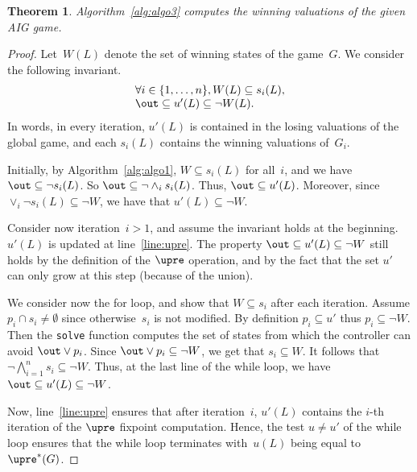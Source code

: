 \documentclass[submission,copyright,creativecommons]{eptcs}
\newtheorem{theorem}{Theorem}
\begin{document}
\begin{theorem}
  Algorithm~\ref{alg:algo3} computes the winning valuations of the given AIG game.
\end{theorem}
\begin{proof}
    Let~$W(L)$ denote the set of winning states of the game~$G$.
    We consider the following invariant.
    \begin{equation}
    \begin{array}{l}
     \forall i\in\{1,\ldots,n\}, W(L) \subseteq s_i(L),
     \\\out \subseteq u'(L) \subseteq \lnot W(L).
    \end{array}
    \label{eqn:invar3}
    \end{equation}
    In words, in every iteration, 
    $u'(L)$ is contained in the losing valuations of the global game, and
    each $s_i(L)$ contains the winning valuations of~$G_i$.

    Initially, by Algorithm~\ref{alg:algo1}, $W \subseteq s_i(L)$
    for all~$i$, and we have
    $\out \subseteq \lnot s_i(L)$. So $\out \subseteq \lnot \land_i s_i(L)$.
    Thus, $\out \subseteq u'(L)$. 
    Moreover, since $\lor_i \lnot s_i(L) \subseteq \lnot W$, we have
    that $u'(L) \subseteq \lnot W$.


    Consider now iteration~$i>1$, and assume the invariant holds at the
    beginning. $u'(L)$ is updated at line~\ref{line:upre}.
    The property $\out \subseteq u'(L) \subseteq \lnot W$ still holds by the
    definition of the $\upre$ operation, and by the fact that the set $u'$ 
    can only grow at this step (because of the union).

    We consider now the for loop, and show that $W \subseteq s_i$ after each
    iteration. Assume $p_i \cap s_i \neq \emptyset$ since otherwise~$s_i$ is not
    modified. By definition $p_i \subseteq u'$
    thus $p_i \subseteq \lnot W$. Then the \texttt{solve} function
    computes the set of states from which the controller can avoid 
    $\out \lor p_i$. Since $\out \lor p_i \subseteq \lnot W$, we get that $s_i
    \subseteq W$.
    It follows that $\lnot \bigwedge_{i=1}^n s_i \subseteq \lnot W$.
    Thus, at the last line of the while loop, we have $\out \subseteq u'(L)
    \subseteq \lnot W$.

    Now, line~\ref{line:upre} ensures that after iteration~$i$, $u'(L)$ contains 
    the $i$-th iteration of the $\upre$ fixpoint computation. Hence, the test $u\neq
    u'$ of the while loop ensures that the while loop terminates with~$u(L)$
    being equal to~$\upre^*(G)$.
\end{proof}
\end{document}
